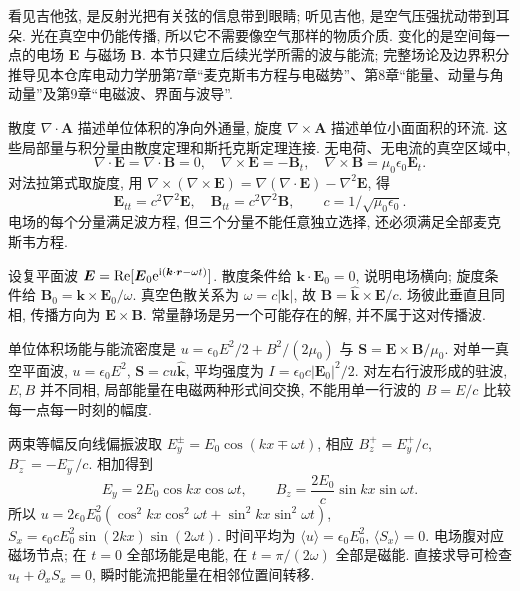 \label{ch:em}
看见吉他弦, 是反射光把有关弦的信息带到眼睛; 听见吉他, 是空气压强扰动带到耳朵. 光在真空中仍能传播, 所以它不需要像空气那样的物质介质. 变化的是空间每一点的电场 $\boldsymbol E$ 与磁场 $\boldsymbol B$. 本节只建立后续光学所需的波与能流; 完整场论及边界积分推导见本仓库电动力学册第7章“麦克斯韦方程与电磁势”、第8章“能量、动量与角动量”及第9章“电磁波、界面与波导”.

散度 $\nabla\cdot\boldsymbol A$ 描述单位体积的净向外通量, 旋度 $\nabla\times\boldsymbol A$ 描述单位小面面积的环流. 这些局部量与积分量由散度定理和斯托克斯定理连接. 无电荷、无电流的真空区域中,
\[
\nabla\cdot\boldsymbol E=\nabla\cdot\boldsymbol B=0,\quad
\nabla\times\boldsymbol E=-\boldsymbol B_t,\quad
\nabla\times\boldsymbol B=\mu_0\epsilon_0\boldsymbol E_t.
\]
对法拉第式取旋度, 用 $\nabla\times(\nabla\times\boldsymbol E)=\nabla(\nabla\cdot\boldsymbol E)-\nabla^2\boldsymbol E$, 得
\[
\boldsymbol E_{tt}=c^2\nabla^2\boldsymbol E,\quad
\boldsymbol B_{tt}=c^2\nabla^2\boldsymbol B,\qquad c=1/\sqrt{\mu_0\epsilon_0}.
\]
电场的每个分量满足波方程, 但三个分量不能任意独立选择, 还必须满足全部麦克斯韦方程.

设复平面波 $\boldsymbol E=\operatorname{Re}[\boldsymbol E_0\mathrm e^{\mathrm i(\boldsymbol k\cdot\boldsymbol r-\omega t)}]$. 散度条件给 $\boldsymbol k\cdot\boldsymbol E_0=0$, 说明电场横向; 旋度条件给 $\boldsymbol B_0=\boldsymbol k\times\boldsymbol E_0/\omega$. 真空色散关系为 $\omega=c|\boldsymbol k|$, 故 $\boldsymbol B=\hat{\boldsymbol k}\times\boldsymbol E/c$. 场彼此垂直且同相, 传播方向为 $\boldsymbol E\times\boldsymbol B$. 常量静场是另一个可能存在的解, 并不属于这对传播波.

单位体积场能与能流密度是 $u=\epsilon_0E^2/2+B^2/(2\mu_0)$ 与 $\boldsymbol S=\boldsymbol E\times\boldsymbol B/\mu_0$. 对单一真空平面波, $u=\epsilon_0E^2$, $\boldsymbol S=cu\hat{\boldsymbol k}$, 平均强度为 $I=\epsilon_0c|\boldsymbol E_0|^2/2$. 对左右行波形成的驻波, $E,B$ 并不同相, 局部能量在电磁两种形式间交换, 不能用单一行波的 $B=E/c$ 比较每一点每一时刻的幅度.

两束等幅反向线偏振波取 $E_y^{\pm}=E_0\cos(kx\mp\omega t)$, 相应 $B_z^+=E_y^+/c$, $B_z^-=-E_y^-/c$. 相加得到
\[
E_y=2E_0\cos kx\cos\omega t,\qquad
B_z=\frac{2E_0}{c}\sin kx\sin\omega t.
\]
所以 $u=2\epsilon_0E_0^2(\cos^2kx\cos^2\omega t+\sin^2kx\sin^2\omega t)$, $S_x=\epsilon_0cE_0^2\sin(2kx)\sin(2\omega t)$. 时间平均为 $\langle u\rangle=\epsilon_0E_0^2$, $\langle S_x\rangle=0$. 电场腹对应磁场节点; 在 $t=0$ 全部场能是电能, 在 $t=\pi/(2\omega)$ 全部是磁能. 直接求导可检查 $u_t+\partial_xS_x=0$, 瞬时能流把能量在相邻位置间转移.

